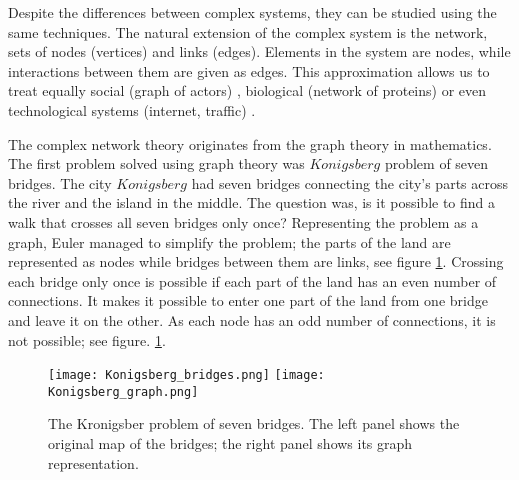 Despite the differences between complex systems, they can be studied using the same techniques. The natural extension of the complex system is the network, sets of nodes (vertices) and links (edges). Elements in the system are nodes, while interactions between them are given as edges. This approximation allows us to treat equally social \cite{myers2014, sarigol2014} (graph of actors) , biological (network of proteins) \cite{fraiman2009ising, schneider2011modeling} or even technological systems (internet, traffic) \cite{costa2007characterization, costa2011analyzing, newman2003structure}. 

The complex network theory originates from the graph theory in mathematics. The first problem solved using graph theory was $Konigsberg$ problem of seven bridges. The city $Konigsberg$ had seven bridges connecting the city's parts across the river and the island in the middle. The question was, is it possible to find a walk that crosses all seven bridges only once? Representing the problem as a graph, Euler managed to simplify the problem; the parts of the land are represented as nodes while bridges between them are links, see figure \ref{fig:Krgraph}. Crossing each bridge only once is possible if each part of the land has an even number of connections. It makes it possible to enter one part of the land from one bridge and leave it on the other. As each node has an odd number of connections, it is not possible; see figure. \ref{fig:Krgraph}.

\begin{figure}[!ht]
	\centering
	\texttt{[image: Konigsberg\_bridges.png]} \hspace{2cm}
	\texttt{[image: Konigsberg\_graph.png]}
	\caption[Konigsberg problem of seven bridges.]{The Kronigsber problem of seven bridges. The left panel shows the original map of the bridges; the right panel shows its graph representation. }

	\label{fig:Krgraph}
\end{figure}

